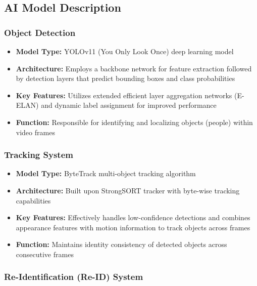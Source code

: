 \subsection{AI Model Description}
\label{subsection:ai-model-description}

\subsubsection{Object Detection}
\label{subsubsection:object-detection}

\begin{itemize}
    \item \textbf{Model Type:} YOLOv11 (You Only Look Once) deep learning model
    \item \textbf{Architecture:} Employs a backbone network for feature extraction followed by detection layers that predict bounding boxes and class probabilities
    \item \textbf{Key Features:} Utilizes extended efficient layer aggregation networks (E-ELAN) and dynamic label assignment for improved performance
    \item \textbf{Function:} Responsible for identifying and localizing objects (people) within video frames
\end{itemize}

\subsubsection{Tracking System}
\label{subsubsection:tracking-system}

\begin{itemize}
    \item \textbf{Model Type:} ByteTrack multi-object tracking algorithm
    \item \textbf{Architecture:} Built upon StrongSORT tracker with byte-wise tracking capabilities
    \item \textbf{Key Features:} Effectively handles low-confidence detections and combines appearance features with motion information to track objects across frames
    \item \textbf{Function:} Maintains identity consistency of detected objects across consecutive frames
\end{itemize}

\subsubsection{Re-Identification (Re-ID) System}
\label{subsubsection:reid-system}

